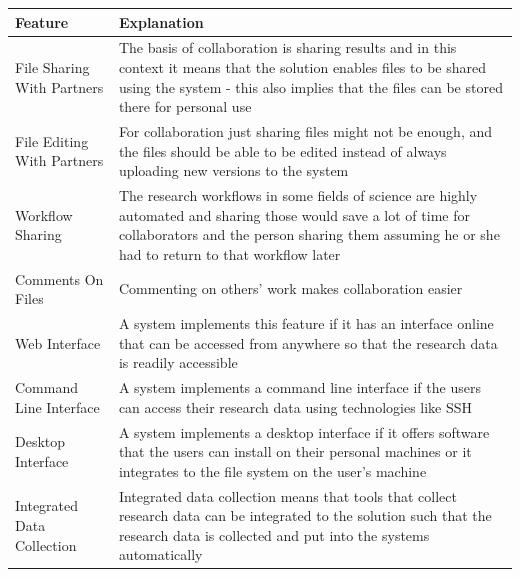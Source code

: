 \addtocounter{table}{-1}
\label{table:management_features}
    \begin{tabularx}{\textwidth}{| >{\raggedright}p{3cm} | X |}
    \hline
    \textbf{Feature} & \textbf{Explanation} \\
    \hline
    \rowcolor{Gray}
    File Sharing With Partners    & The basis of collaboration is sharing results and in this
                                    context it means that the solution enables files to be
                                    shared using the system - this also implies that the files
                                    can be stored there for personal use\\
    \hline
    File Editing With Partners & For collaboration just sharing files might not be enough, and
                                 the files should be able to be edited instead of always uploading
                                 new versions to the system\\
    \hline
    \rowcolor{Gray}
    Workflow Sharing    &  The research workflows in some fields of science are highly automated
                           and sharing those would save a lot of time for collaborators and the person
                           sharing them assuming he or she had to return to that workflow later\\
    \hline
    Comments On Files    & Commenting on others' work makes collaboration easier\\
    \hline
    \rowcolor{Gray}
    Web Interface          & A system implements this feature if it has an interface online that
                             can be accessed from anywhere so that the research data is readily
                             accessible\\
    \hline
    Command Line Interface    & A system implements a command line interface if the users can access
                                their research data using technologies like SSH\\
    \hline
    \rowcolor{Gray}
    Desktop Interface       & A system implements a desktop interface if it offers software that the
                              users can install on their personal machines or it integrates to the
                              file system on the user's machine\\
    \hline
    Integrated Data Collection    & Integrated data collection means that tools that collect research
                                    data can be integrated to the solution such that the research data
                                    is collected and put into the systems automatically\\
    \hline
\end{tabularx}

